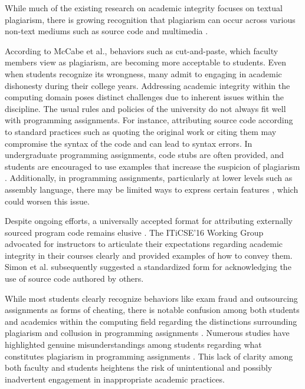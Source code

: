 While much of the existing research on academic integrity focuses on textual plagiarism, there is growing recognition that plagiarism can occur across various non-text mediums such as source code and multimedia \cite{Marcin2016,10.1145/2526968.2526971}.

According to McCabe et al.\cite{84f6c08b47844b54868caf82c625fc66}, behaviors such as cut-and-paste, which faculty members view as plagiarism, are becoming more acceptable to students. Even when students recognize its wrongness, many admit to engaging in academic dishonesty during their college years\cite{Bernardi2004-BERETD}. Addressing academic integrity within the computing domain poses distinct challenges due to inherent issues within the discipline. The usual rules and policies of the university do not always fit well with programming assignments. For instance, attributing source code according to standard practices such as quoting the original work or citing them may compromise the syntax of the code and can lead to syntax errors. 
In undergraduate programming assignments, code stubs are often provided, and students are encouraged to use examples that increase the suspicion of plagiarism \cite{10.5555/1151869.1151888}. Additionally, in programming assignments, particularly at lower levels such as assembly language, there may be limited ways to express certain features \cite{10.1145/3160489.3160502}, which could worsen this issue.

Despite ongoing efforts, a universally accepted format for attributing externally sourced program code remains elusive \cite{10.1145/1562877.1562900}. The ITiCSE’16 Working Group \cite{10.1145/3024906.3024910} advocated for instructors to articulate their expectations regarding academic integrity in their courses clearly and provided examples of how to convey them. Simon et al.\cite{10.1145/3160489.3160502} subsequently suggested a standardized form for acknowledging the use of source code authored by others. 

While most students clearly recognize behaviors like exam fraud and outsourcing assignments as forms of cheating, there is notable confusion among both students and academics within the computing field regarding the distinctions surrounding plagiarism and collusion in programming assignments \cite{SCPlagiarism}. Numerous studies have highlighted genuine misunderstandings among students regarding what constitutes plagiarism in programming assignments \cite{SCPlagiarism, Cosma2008TowardsAD, 10.1145/637610.544468, 10.1145/2526968.2526971}. This lack of clarity among both faculty and students heightens the risk of unintentional and possibly inadvertent engagement in inappropriate academic practices. 


